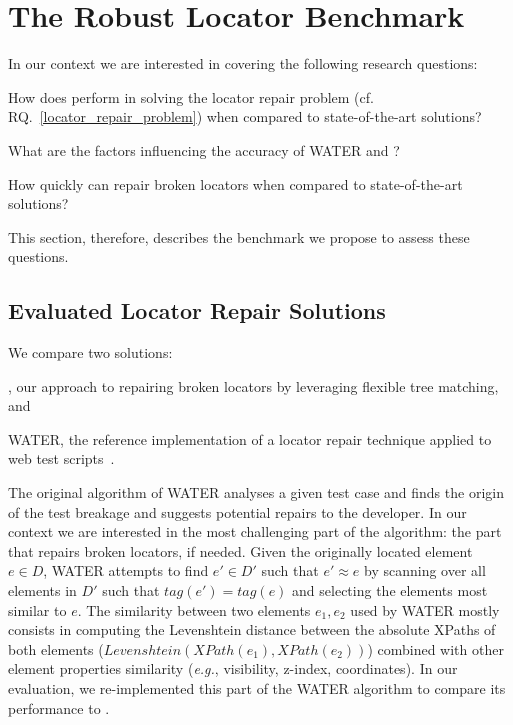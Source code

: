 \section{The Robust Locator Benchmark}\label{erratum:sec:benchmark}
In our context we are interested in covering the following research questions:
\begin{rqn}\label{rq:performance}
    How does \erratum{} perform in solving the locator repair problem (cf. RQ.~\ref{locator_repair_problem}) when compared to state-of-the-art solutions?
\end{rqn}
\begin{rqn}\label{rq:influenceFactors}
    What are the factors influencing the accuracy of WATER and \erratum?
\end{rqn}
\begin{rqn}\label{rq:computationTime}
    How quickly can \erratum{} repair broken locators when compared to state-of-the-art solutions?
\end{rqn}
This section, therefore, describes the benchmark we propose to assess these questions.

\subsection{Evaluated Locator Repair Solutions}\label{erratum:sec:consideredSolutions}
We compare two solutions: 
\begin{inparaenum}
    \item \erratum{}, our approach to repairing broken locators by leveraging flexible tree matching, and
    \item WATER, the reference implementation of a locator repair technique applied to web test scripts~\cite{choudhary2011water}.
\end{inparaenum}

The original algorithm of WATER analyses a given test case and finds the origin of the test breakage and suggests potential repairs to the developer.
In our context we are interested in the most challenging part of the algorithm: the part that repairs broken locators, if needed.
Given the originally located element $e \in D$, WATER attempts to find $e' \in D'$ such that $e' \approx e$ by scanning over all elements in $D'$ such that $tag(e') = tag(e)$ and selecting the elements most similar to $e$. 
The similarity between two elements $e_1, e_2$ used by WATER mostly consists in computing the Levenshtein distance between the absolute XPaths of both elements ($Levenshtein(XPath(e_1), XPath(e_2))$) combined with other element properties similarity (\emph{e.g.}, visibility, z-index, coordinates).
In our evaluation, we re-implemented this part of the WATER algorithm to compare its performance to \erratum{}.

